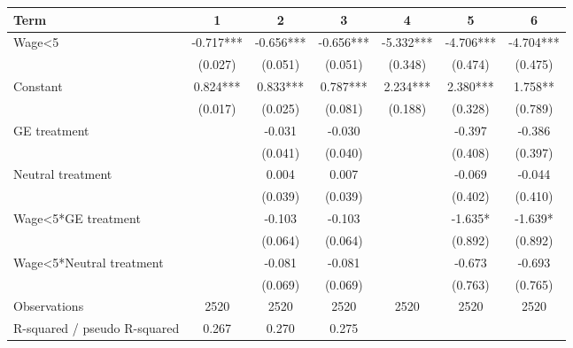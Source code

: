\begin{tabular}{lcccccc}
\hline
Term & 1 & 2 & 3 & 4 & 5 & 6 \\
\hline
Wage<5 & -0.717*** & -0.656*** & -0.656*** & -5.332*** & -4.706*** & -4.704*** \\
 & (0.027) & (0.051) & (0.051) & (0.348) & (0.474) & (0.475) \\
Constant & 0.824*** & 0.833*** & 0.787*** & 2.234*** & 2.380*** & 1.758** \\
 & (0.017) & (0.025) & (0.081) & (0.188) & (0.328) & (0.789) \\
GE treatment &  & -0.031 & -0.030 &  & -0.397 & -0.386 \\
 &  & (0.041) & (0.040) &  & (0.408) & (0.397) \\
Neutral treatment &  & 0.004 & 0.007 &  & -0.069 & -0.044 \\
 &  & (0.039) & (0.039) &  & (0.402) & (0.410) \\
Wage<5*GE treatment &  & -0.103 & -0.103 &  & -1.635* & -1.639* \\
 &  & (0.064) & (0.064) &  & (0.892) & (0.892) \\
Wage<5*Neutral treatment &  & -0.081 & -0.081 &  & -0.673 & -0.693 \\
 &  & (0.069) & (0.069) &  & (0.763) & (0.765) \\
Observations & 2520 & 2520 & 2520 & 2520 & 2520 & 2520 \\
R-squared / pseudo R-squared & 0.267 & 0.270 & 0.275 &  &  &  \\
\hline
\end{tabular}
